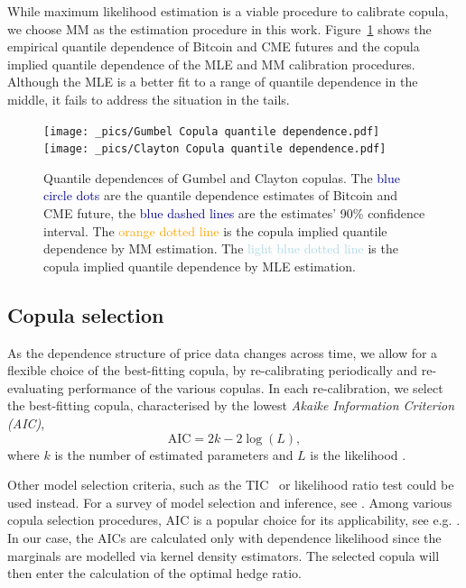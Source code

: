 While maximum likelihood estimation is a viable procedure to calibrate copula, 
we choose MM as the estimation procedure in this work. 
Figure~\ref{fig:quantile dependence1} shows the empirical quantile
dependence of Bitcoin and CME futures and the copula implied quantile
dependence of the MLE and MM calibration procedures. 
Although the MLE is a better fit to a range of quantile dependence in
the middle, it fails to address the situation in the tails. 

\begin{figure}[h]
\texttt{[image: \_pics/Gumbel Copula quantile dependence.pdf]}
\texttt{[image: \_pics/Clayton Copula quantile dependence.pdf]}
  \caption{Quantile dependences of Gumbel and Clayton copulas. The
    \textcolor{darkblue}{blue circle dots} are the quantile dependence
    estimates of Bitcoin and CME future, the \textcolor{darkblue}{blue
      dashed lines} are the estimates' 90\% confidence interval. 
  The \textcolor{orange}{orange dotted line} is the copula implied
  quantile dependence by MM estimation. The
  \textcolor{lightblue}{light blue dotted line} is the copula implied
  quantile dependence by MLE estimation.  
  }
\label{fig:quantile dependence1}
\end{figure}

\subsection{Copula selection}\label{subsec:copula-selection}
As the dependence structure of price data changes
across time, we allow for a flexible choice of the best-fitting
copula, by re-calibrating periodically and re-evaluating performance
of the various copulas. 
In each re-calibration, we select the best-fitting
copula, characterised by the lowest {\em Akaike Information Criterion
  (AIC)},
\begin{equation*}
 \text{AIC} = 2k- 2 \log(L),
\end{equation*}
where $k$ is the number of estimated
parameters and $L$ is the likelihood \citep{Akaike1973}. 

Other model selection criteria, such as the TIC~\citep{takeuchi1976distribution} or likelihood ratio test could be used instead.
For a survey of model selection and inference, see \cite{anderson1998comparison}.
Among various copula selection procedures, AIC is a popular choice for
its applicability, see e.g. \cite{breymann2003dependence}.
In our case, the AICs are calculated only with dependence likelihood
since the marginals are modelled via kernel density estimators.
The selected copula will then enter the calculation of the optimal
hedge ratio.

